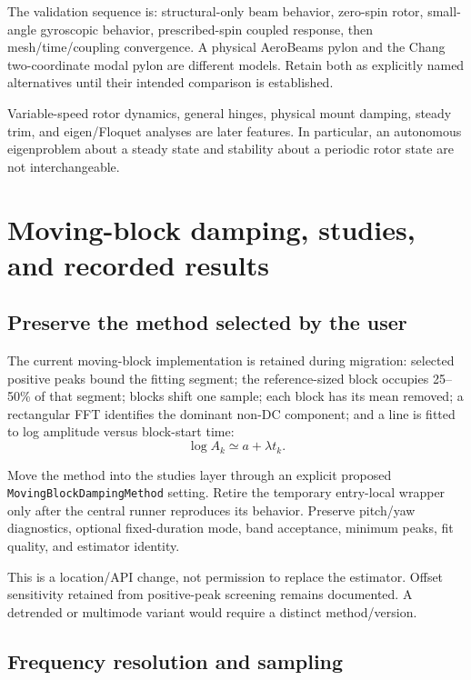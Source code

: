 \documentclass[11pt,a4paper]{article}
\newcommand{\code}{\nolinkurl}
\begin{document}
The validation sequence is: structural-only beam behavior, zero-spin rotor,
small-angle gyroscopic behavior, prescribed-spin coupled response, then
mesh/time/coupling convergence. A physical AeroBeams pylon and the Chang
two-coordinate modal pylon are different models. Retain both as explicitly
named alternatives until their intended comparison is established.

Variable-speed rotor dynamics, general hinges, physical mount damping, steady
trim, and eigen/Floquet analyses are later features. In particular, an
autonomous eigenproblem about a steady state and stability about a periodic
rotor state are not interchangeable.

\section{Moving-block damping, studies, and recorded results}

\subsection{Preserve the method selected by the user}

The current moving-block implementation is retained during migration:
selected positive peaks bound the fitting segment; the reference-sized block
occupies 25--50\% of that segment; blocks shift one sample; each block has its
mean removed; a rectangular FFT identifies the dominant non-DC component;
and a line is fitted to log amplitude versus block-start time:
\begin{equation}
 \log A_k\simeq a+\lambda t_k.
\end{equation}

Move the method into the studies layer through an explicit proposed
\code{MovingBlockDampingMethod} setting. Retire the temporary entry-local
wrapper only after the central runner reproduces its behavior. Preserve
pitch/yaw diagnostics, optional fixed-duration mode, band acceptance,
minimum peaks, fit quality, and estimator identity.

This is a location/API change, not permission to replace the estimator.
Offset sensitivity retained from positive-peak screening remains documented.
A detrended or multimode variant would require a distinct method/version.

\subsection{Frequency resolution and sampling}
\end{document}
